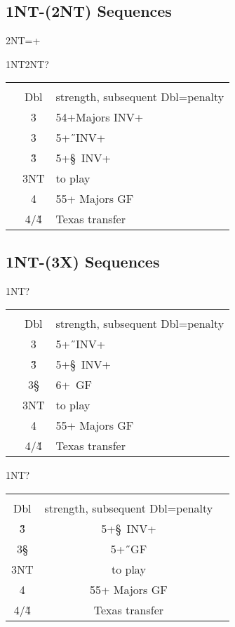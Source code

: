 \subsection{1NT-(2NT) Sequences}

2NT=\C+\D\
\begin{bidding}
\>\>1NT\>2NT\>? \\
\end{bidding}

\begin{longtable}{C{\linklength} C{\bidlength} l}
 & \mylinkt \\
& Dbl & strength, subsequent Dbl=penalty \\
& 3\C & 54+Majors INV+ \\
& 3\D & 5+\H\ INV+ \\
& 3\H & 5+\S\ INV+ \\
& 3NT & to play \\
& 4\C & 55+ Majors GF \\
& 4\D/4\H & Texas transfer \\
\end{longtable}

\subsection{1NT-(3X) Sequences}

\begin{bidding}
\>\>1NT\C\>? \\
\end{bidding}

\begin{longtable}{C{\linklength} C{\bidlength} l}
 & \mylinkt \\
& Dbl & strength, subsequent Dbl=penalty \\
& 3\D & 5+\H\ INV+ \\
& 3\H & 5+\S\ INV+ \\
& 3\S & 6+\D\ GF \\
& 3NT & to play \\
& 4\C & 55+ Majors GF \\
& 4\D/4\H & Texas transfer \\
\end{longtable}

\begin{bidding}
\>\>1NT\D\>? \\
\end{bidding}

\begin{longtable}{C{\linklength} C{\bidlength} l}
 & \mylinkt \\
Dbl & strength, subsequent Dbl=penalty \\
3\H & 5+\S\ INV+ \\
3\S & 5+\H\ GF \\
3NT & to play \\
4\C & 55+ Majors GF \\
4\D/4\H & Texas transfer \\
\end{longtable}

